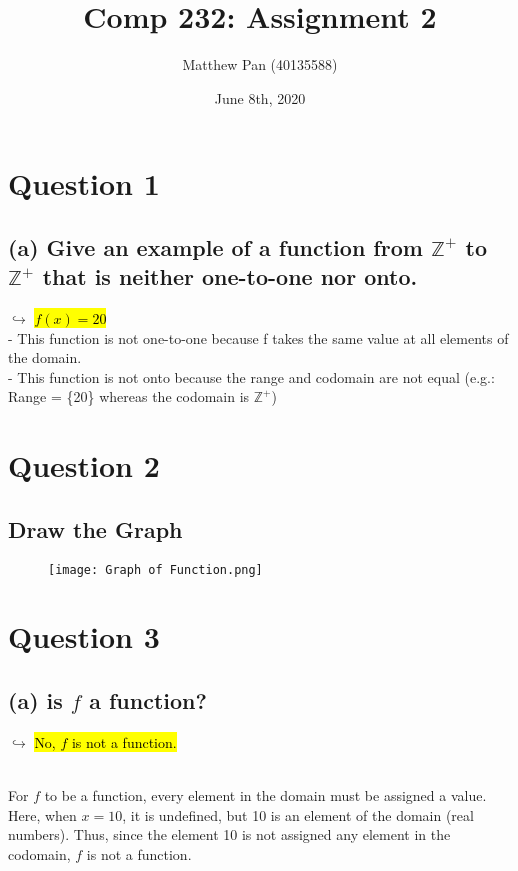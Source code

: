 \documentclass[a4paper, 12pt]{article}
\title{Comp 232: Assignment 2}
\author{Matthew Pan (40135588)}
\date{June 8th, 2020}
\begin{document}
	\pagecolor{white}
	\maketitle
	\setlength{\parindent}{0pt}
	
\section*{Question 1}

\subsection*{(a) Give an example of a function from $\mathbb{Z^+}$ to $\mathbb{Z^+}$ that is neither one-to-one nor onto.}
$\hookrightarrow$ \hl{$f(x) = 20$}\\

- This function is not one-to-one because f takes the same value at all elements of the domain.\\

- This function is not onto because the range and codomain are not equal (e.g.: Range = \{20\} whereas the codomain is $\mathbb{Z^+}$)

\section*{Question 2}
\subsection*{Draw the Graph}

\begin{figure}[htp]
    \centering
    \texttt{[image: Graph of Function.png]}
    \label{fig:graph}
\end{figure}

\section*{Question 3}

\subsection*{(a) is $f$ a function?}

$\hookrightarrow$ \hl{No, $f$ is not a function.}\\\

For $f$ to be a function, every element in the domain must be assigned a value. Here, when $x=10$, it is undefined, but 10 is an element of the domain (real numbers). Thus, since the element 10 is not assigned any element in the codomain, $f$ is not a function.\\
\end{document}

